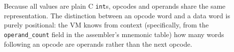 Because all values are plain C \texttt{int}s, opcodes and operands share the same representation. The distinction between an opcode word and a data word is purely positional: the VM knows from context (specifically, from the \texttt{operand\_count} field in the assembler's mnemonic table) how many words following an opcode are operands rather than the next opcode.